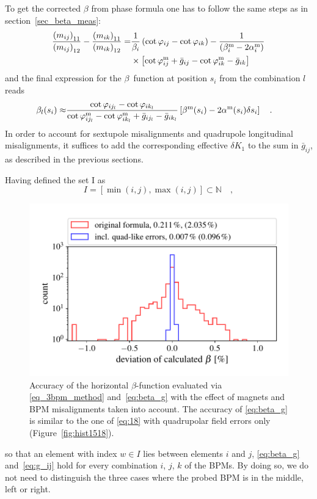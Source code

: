 %
To get the corrected $\beta$ from phase formula one has to follow the same steps as in section~\ref{sec_beta_meas}:
%
\begin{align}
    \frac{\left(m_{ij}\right)_{11}}{\left(m_{ij}\right)_{12}} - \frac{\left(m_{ik}\right)_{11}}{\left(m_{ik}\right)_{12}}
    =&
    \frac{1}{\beta_i} \left( \cot\varphi_{ij} - \cot\varphi_{ik}\right)
    -
    \frac{1}{\left(\beta_i^\text{m} - 2\alpha_i^\text{m} \right) } 
    \notag \\
    &\times\left[
        \cot\varphi_{ij}^\text{m}  + \bar{g}_{ij}
        -
        \cot\varphi_{ik}^\text{m}  - \bar{g}_{ik}
    \right]
\end{align}
%
and the final expression for the $\beta$~function at position $s_i$ from the combination $l$ reads
%
\begin{align}
\beta_l(s_i) \approx& \frac{\cot\varphi_{i{j_l}} - \cot\varphi_{i{k_l}}}{\cot\varphi_{i{j_l}}^\text{m} - \cot\varphi_{i{k_l}}^\text{m} +\bar{g}_{i{j_l}} - \bar{g}_{i{k_l}}} \left[\beta^\text{m}(s_i) - 2 \alpha^\text{m}(s_i) \delta s_i\right]
    \quad .
\label{eq:beta_g}
\end{align}
%
In order to account for sextupole misalignments and quadrupole longitudinal misalignments, it suffices
to add the corresponding effective $\delta K_1$ to the sum in $\bar{g}_{ij}$,
as described in the previous sections. 

Having defined the set I as
%
\begin{equation}
 I = \left[\min(i,j), \max(i,j)\right] \subset \mathbb{N}\quad ,
 \end{equation}
%
\begin{figure}
	\centering
  \includegraphics[width=.7\linewidth]{hist1518_EVERYTHING_01}
    \caption{Accuracy of the horizontal $\beta$-function evaluated via \eqref{eq_3bpm_method} and~\eqref{eq:beta_g} with the effect of magnets and BPM misalignments taken into account. The accuracy of
 \eqref{eq:beta_g} is similar to the one of \eqref{eq:18} with quadrupolar field errors only (Figure~\ref{fig:hist1518}).}
	\label{fig:hist1518_with_everything}
\end{figure}
%
so that an element with index $ w \in I$ lies between elements $ i $ and $ j $, \eqref{eq:beta_g}
and~\eqref{eq:g_ij} hold for every combination $ i $, $ j $, $ k $ of the BPMs.
 By doing so, we do not need to distinguish the three cases where the probed BPM is in the middle, left or right.


